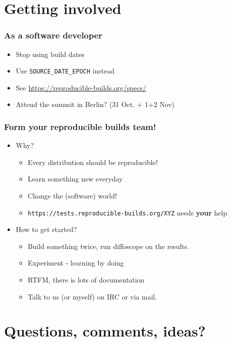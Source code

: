 \documentclass[14pt,aspectratio=169]{beamer}
\newif\ifplacelogo
\begin{document}
\section{Getting involved}

\begin{frame}
 \frametitle{As a software developer}
 \begin{itemize}
  \item Stop using build dates
  \item Use \texttt{SOURCE\_DATE\_EPOCH} instead
  \item See \url{https://reproducible-builds.org/specs/}
  \item<2> Attend the summit in Berlin? (31 Oct. + 1+2 Nov)
 \end{itemize}
\end{frame}


\begin{frame}
 \frametitle{Form your reproducible builds team!}
 \begin{itemize}
  \item Why?
   \begin{itemize}
    \item Every distribution should be reproducible!
    \item Learn something new everyday
    \item Change the (software) world!
    \item \texttt{https://tests.reproducible-builds.org/XYZ} needs \textbf{your} help
   \end{itemize}
  \item How to get started?
   \begin{itemize}
    \item Build something twice, run diffoscope on the results.
    \item Experiment - learning by doing
    \item RTFM, there is lots of documentation
    \item Talk to us (or myself) on IRC or via mail.
   \end{itemize}
 \end{itemize}
\end{frame}

\section{Questions, comments, ideas?}

\placelogotrue
\end{document}
